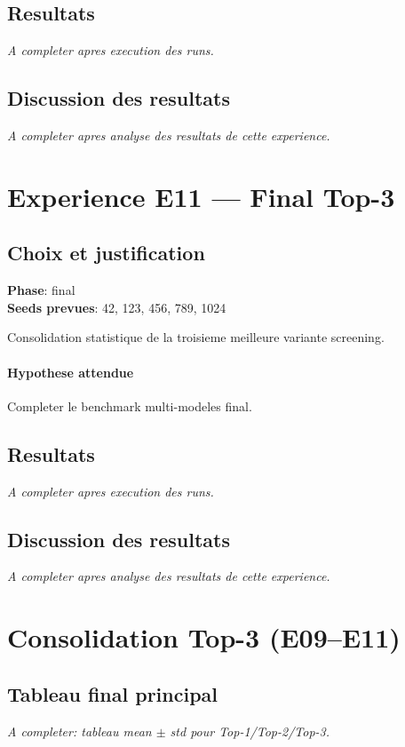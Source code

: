 \documentclass[11pt,a4paper]{article}
\begin{document}
\subsection{Resultats}
\textit{A completer apres execution des runs.}

\subsection{Discussion des resultats}
\textit{A completer apres analyse des resultats de cette experience.}


\section{Experience E11 --- Final Top-3}
\subsection{Choix et justification}
\textbf{Phase}: final\\
\textbf{Seeds prevues}: 42, 123, 456, 789, 1024

Consolidation statistique de la troisieme meilleure variante screening.

\paragraph{Hypothese attendue}
Completer le benchmark multi-modeles final.

\subsection{Resultats}
\textit{A completer apres execution des runs.}

\subsection{Discussion des resultats}
\textit{A completer apres analyse des resultats de cette experience.}


\section{Consolidation Top-3 (E09--E11)}
\subsection{Tableau final principal}
\textit{A completer: tableau mean $\pm$ std pour Top-1/Top-2/Top-3.}
\end{document}
